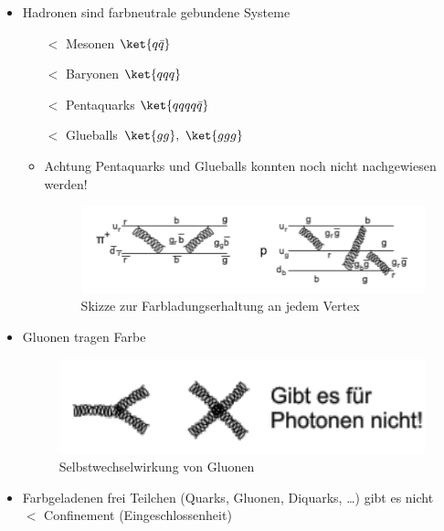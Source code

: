 \begin{itemize}
\begin{itemize}
\end{itemize}
\item Hadronen sind farbneutrale gebundene Systeme
\begin{itemize}
\item[$\lt$] Mesonen $\ket{q\bar{q}}$
\item[$\lt$] Baryonen $\ket{qqq}$
\item[$\lt$] \glqq Pentaquarks\grqq{} $\ket{qqqq\bar{q}}$
\item[$\lt$] \glqq Glueballs\grqq{} $\ket{gg}, \ \ket{ggg}$
\item Achtung Pentaquarks und Glueballs konnten noch nicht nachgewiesen werden!
\begin{figure}[!ht]
\centering
\includegraphics[width=.75\textwidth]{imgs/ep5-fig-7-3.pdf}
\caption{Skizze zur Farbladungserhaltung an jedem Vertex\label{fig:7.3}}
\end{figure}
\end{itemize}
\item Gluonen tragen Farbe

\begin{figure}[!ht]
\centering
\includegraphics[width=.4\textwidth]{imgs/ep5-fig-7-4Gluonen.pdf}
\caption{Selbstwechselwirkung von Gluonen\label{fig:7.glue}}
\end{figure}

\item Farbgeladenen frei Teilchen (Quarks, Gluonen, Diquarks, \dots ) gibt es nicht\\
$\lt$ Confinement (\glqq Eingeschlossenheit\grqq)
\end{itemize}
\newpage
